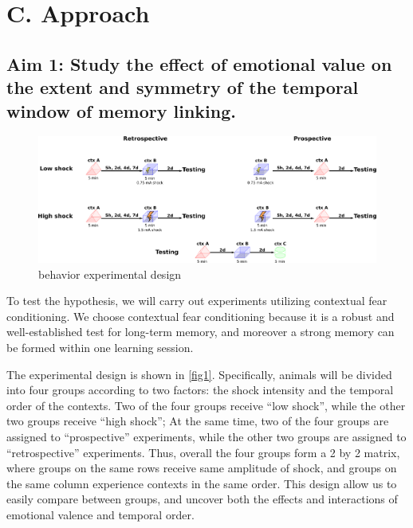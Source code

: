 \documentclass[master.tex]{subfiles}
\begin{document}
\section*{C. Approach}

\subsection*{Aim 1: Study the effect of emotional value on the extent and
  symmetry of the temporal window of memory linking.}

\begin{figure}[!b]
  \centering \includegraphics[scale = .135]{Figures/full.pdf}
  \caption{\footnotesize behavior experimental design}
  \label{fig1}
\end{figure}

To test the hypothesis, we will carry out experiments utilizing contextual fear
conditioning. We choose contextual fear conditioning because it is a robust and
well-established test for long-term memory, and moreover a strong memory can be
formed within one learning session.

The experimental design is shown in \autoref{fig1}. Specifically, animals will
be divided into four groups according to two factors: the shock intensity and
the temporal order of the contexts. Two of the four groups receive ``low
shock'', while the other two groups receive ``high shock''; At the same time,
two of the four groups are assigned to ``prospective'' experiments, while the
other two groups are assigned to ``retrospective'' experiments. Thus, overall
the four groups form a 2 by 2 matrix, where groups on the same rows receive same
amplitude of shock, and groups on the same column experience contexts in the
same order. This design allow us to easily compare between groups, and uncover
both the effects and interactions of emotional valence and temporal order.
\end{document}
